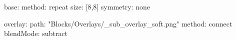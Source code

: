 base:
  method: repeat
  size: [8,8]
  symmetry: none

overlay:
  path: "Blocks/Overlays/_sub_overlay_soft.png"
  method: connect
blendMode: subtract